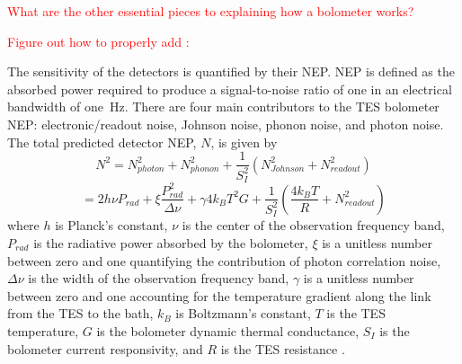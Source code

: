 
\textcolor{red}{What are the other essential pieces to explaining how a bolometer works?}


\textcolor{red}{Figure out how to properly add : 
}


The sensitivity of the detectors is quantified by their \ac{NEP}. 
\ac{NEP} is defined as the absorbed power required to produce a signal-to-noise ratio of one in an electrical bandwidth of one~Hz. 
There are four main contributors to the \ac{TES} bolometer \ac{NEP}: electronic/readout noise, Johnson noise, phonon noise, and photon noise. 
The total predicted detector \ac{NEP}, $N$, is given by 
\begin{equation}
N^{2} = N_{photon}^2 + N_{phonon}^2 + \frac{1}{S_I^2} ( N_{Johnson}^2 + N_{readout}^2 )
\end{equation}
\begin{equation}
= 2h\nu P_{rad} + \xi \frac{P_{rad}^2}{\Delta \nu} + \gamma 4k_{B} T^2 G + \frac{1}{S_I^2} (\frac{4k_{B}T}{R} + N_{readout}^2 )
\label{eq:nep}
\end{equation}
where $h$ is Planck's constant, $\nu$ is the center of the observation frequency band, $P_{rad}$ is the radiative power absorbed by the bolometer, $\xi$ is a unitless number between zero and one quantifying the contribution of photon correlation noise, $\Delta \nu$ is the width of the observation frequency band, $\gamma$ is a unitless number between zero and one accounting for the temperature gradient along the link from the \ac{TES} to the bath, $k_{B}$ is Boltzmann's constant, $T$ is the \ac{TES} temperature, $G$ is the bolometer dynamic thermal conductance, $S_{I}$ is the bolometer current responsivity, and $R$ is the \ac{TES} resistance \cite{Mather1982}. 


